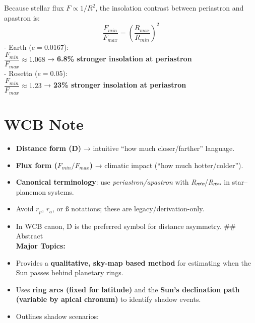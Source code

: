 \documentclass[
  letterpaper,
]{book}
\providecommand{\tightlist}{%
  \setlength{\itemsep}{0pt}\setlength{\parskip}{0pt}}
\begin{document}
Because stellar flux \(F ∝ 1/R^2\), the insolation contrast between
periastron and apastron is: \[
\frac{F_{min}}{F_{max}} = \left(\frac{R_{max}}{R_{min}}\right)^2
\] - Earth (\(e = 0.0167\)):\\
\(\dfrac{F_{min}}{F_{max}} \approx 1.068\) → \textbf{6.8\% stronger
insolation at periastron}\\
- Rosetta (\(e = 0.05\)):\\
\(\dfrac{F_{min}}{F_{max}} \approx 1.23\) → \textbf{23\% stronger
insolation at periastron}

\section{WCB Note}\label{wcb-note}

\begin{itemize}
\tightlist
\item
  \textbf{Distance form (Ḋ)} → intuitive ``how much closer/farther''
  language.\\
\item
  \textbf{Flux form (\(F_{min}/F_{max}\))} → climatic impact (``how much
  hotter/colder'').\\
\item
  \textbf{Canonical terminology}: use \emph{periastron/apastron} with
  \emph{Rₘᵢₙ}/\emph{Rₘₐₓ} in star--planemon systems.\\
\item
  Avoid \(r_p\), \(r_a\), or ß notations; these are
  legacy/derivation-only.\\
\item
  In WCB canon, Ḋ is the preferred symbol for distance asymmetry. \#\#
  Abstract\\
  \textbf{Major Topics:}\\
\item
  Provides a \textbf{qualitative, sky-map based method} for estimating
  when the Sun passes behind planetary rings.\\
\item
  Uses \textbf{ring arcs (fixed for latitude)} and the \textbf{Sun's
  declination path (variable by apical chronum)} to identify shadow
  events.\\
\item
  Outlines shadow scenarios:


\end{itemize}
\end{document}
